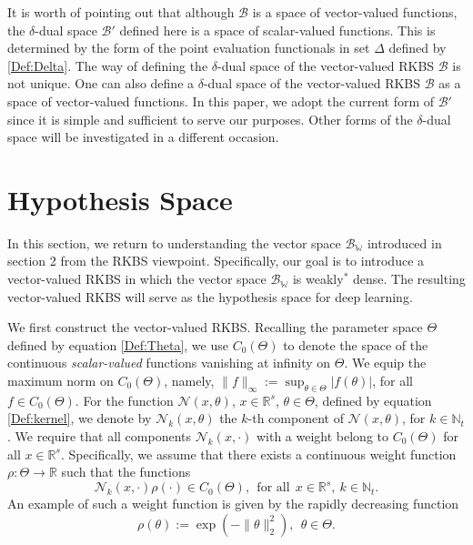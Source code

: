 \documentclass[11pt]{article}
\begin{document}
It is worth of pointing out that although $\mathcal{B}$ is a space of vector-valued functions, the $\delta$-dual space  $\mathcal{B}'$ defined here is a space of scalar-valued functions.  This is determined by the form of the point evaluation functionals in set $\Delta$ defined by \eqref{Def:Delta}. The way of defining the $\delta$-dual space of the vector-valued RKBS $\mathcal{B}$ is not unique. One can also define a $\delta$-dual space of the vector-valued RKBS $\mathcal{B}$ as a space of vector-valued functions. In this paper, we adopt the current form of $\mathcal{B}'$ since it is simple and sufficient to serve our purposes. Other forms of the $\delta$-dual space will be investigated in a different occasion.

%
\section{Hypothesis Space}
%

In this section, we return to understanding the vector space $\mathcal{B}_\mathbb{W}$ introduced in section 2 from the RKBS viewpoint. Specifically, our goal is to introduce a vector-valued RKBS in which the vector space $\mathcal{B}_\mathbb{W}$ is weakly$^*$ dense. The resulting vector-valued RKBS will serve as the hypothesis space for deep learning.

We first construct the vector-valued RKBS. Recalling the parameter space $\Theta$ defined by equation \eqref{Def:Theta}, we use $C_0(\Theta)$ to denote the space of the continuous {\it scalar-valued} functions vanishing at infinity on $\Theta$. We equip the maximum norm on $C_0(\Theta)$, namely, $\|f\|_{\infty}:=\sup_{\theta\in\Theta}|f(\theta)|$, for all $f\in C_0(\Theta)$. For the function $\mathcal{N}(x,\theta)$, $x\in\mathbb{R}^s$, $\theta\in\Theta$, defined by equation \eqref{Def:kernel}, we denote by $\mathcal{N}_k({x},\theta)$ the $k$-th component of $\mathcal{N}({x},\theta)$, for $k\in\mathbb{N}_t$.  
We require that all components $\mathcal{N}_k({x},\cdot)$ with a weight belong to $C_0(\Theta)$ for all $x\in\mathbb{R}^s$. Specifically, we assume that there exists
a continuous weight function $\rho:\Theta\to\mathbb{R}$ such that the functions 
$$
\mathcal{N}_k({x},\cdot)\rho(\cdot)\in C_0(\Theta), \ \ \mbox{for all} \ \ x\in \mathbb{R}^s, \ k\in\mathbb{N}_t.
$$
An example of such a weight function is given by the rapidly decreasing function
\begin{equation}\label{gaussian weight function}
    \rho(\theta):=\exp(-\|\theta\|_2^2), \ \ \theta\in\Theta.
\end{equation}
\end{document}
